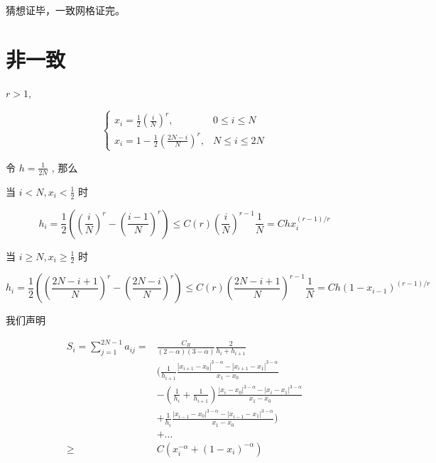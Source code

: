 \documentclass{ctexart}
\begin{document}
猜想证毕，一致网格证完。


\section{非一致}

\(r > 1\), 

\begin{equation}
    \begin{cases}
        x_i = \frac{1}{2} \left(\frac{i}{N}\right)^r   , & 0 \le i \le N  \\
        x_i = 1 - \frac{1}{2} \left(\frac{2N-i}{N}\right)^r, &  N \le i \le 2N
    \end{cases}
\end{equation}

令 \(h=\frac{1}{2N}\) , 那么

当 \(i < N, x_i < \frac{1}{2}\) 时

\begin{equation}
    h_i = \frac{1}{2} \left(\left(\frac{i}{N}\right)^r - \left(\frac{i-1}{N}\right)^r\right) 
        \le C(r) \left(\frac{i}{N}\right)^{r-1} \frac{1}{N} = C h x_i^{(r-1)/r} 
\end{equation}

当 \(i \ge N, x_i \ge \frac{1}{2}\) 时

\begin{equation}
    h_i = \frac{1}{2} \left(\left(\frac{2N-i+1}{N}\right)^r - \left(\frac{2N-i}{N}\right)^r\right) 
        \le C(r) \left(\frac{2N-i+1}{N}\right)^{r-1} \frac{1}{N} = C h (1-x_{i-1})^{(r-1)/r} 
\end{equation}


我们声明

\begin{equation}
    \begin{aligned}
        S_i =\sum_{j=1}^{2N-1}a_{ij} = & \frac{C_R}{(2-\alpha)(3-\alpha)} \frac{2}{h_i + h_{i+1}} \\
        & ( \frac{1}{h_{i+1}} \frac{|x_{i+1}-x_0|^{3-\alpha} - |x_{i+1}-x_1|^{3-\alpha}}{x_1 - x_0} \\ 
        &- (\frac{1}{h_{i}}+\frac{1}{h_{i+1}})\frac{|x_{i}-x_0|^{3-\alpha} - |x_{i}-x_1|^{3-\alpha}}{x_1 - x_0}     \\ 
        &+  \frac{1}{h_{i}} \frac{|x_{i-1}-x_0|^{3-\alpha} - |x_{i-1}-x_1|^{3-\alpha}}{x_1 - x_0} )\\
        & + ... \\
        \ge & C (x_i^{-\alpha} + (1-x_i)^{-\alpha})
    \end{aligned}
\end{equation}
\end{document}
